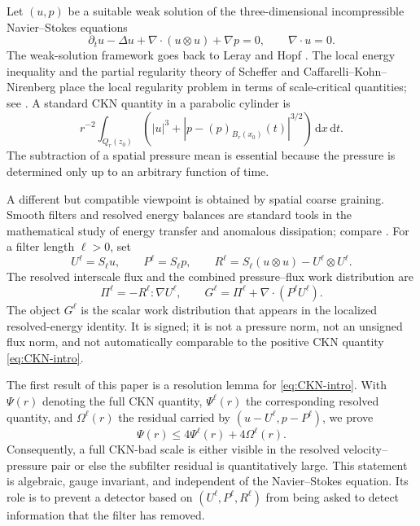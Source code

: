 \documentclass[11pt]{article}
\numberwithin{equation}{section}
\newcommand{\dxdt}{\,\mathrm dx\,\mathrm dt}
\begin{document}
Let \((u,p)\) be a suitable weak solution of the three-dimensional incompressible Navier--Stokes equations
\begin{equation}\label{eq:NS}
\partial_t u-\Delta u+\nabla\cdot(u\otimes u)+\nabla p=0,
\qquad \nabla\cdot u=0.
\end{equation}
The weak-solution framework goes back to Leray and Hopf \cite{Leray1934,Hopf1951}.  The local energy inequality and the partial regularity theory of Scheffer and Caffarelli--Kohn--Nirenberg place the local regularity problem in terms of scale-critical quantities; see \cite{Scheffer1976,CKN1982,Lin1998,Vasseur2007,LemarieRieusset2002,LemarieRieusset2016,Seregin2015}.  A standard CKN quantity in a parabolic cylinder is
\begin{equation}\label{eq:CKN-intro}
r^{-2}\int_{Q_r(z_0)}\left(|u|^3+|p-(p)_{B_r(x_0)}(t)|^{3/2}\right)\dxdt.
\end{equation}
The subtraction of a spatial pressure mean is essential because the pressure is determined only up to an arbitrary function of time.

A different but compatible viewpoint is obtained by spatial coarse graining.  Smooth filters and resolved energy balances are standard tools in the mathematical study of energy transfer and anomalous dissipation; compare \cite{ConstantinETiti1994,DuchonRobert2000,Eyink2005,EyinkAluie2009,DrivasNguyen2018}.  For a filter length \(\ell>0\), set
\[
U^\ell=S_\ell u,
\qquad
P^\ell=S_\ell p,
\qquad
R^\ell=S_\ell(u\otimes u)-U^\ell\otimes U^\ell.
\]
The resolved interscale flux and the combined pressure--flux work distribution are
\begin{equation}\label{eq:G-intro}
\Pi^\ell=-R^\ell:\nabla U^\ell,
\qquad
G^\ell=\Pi^\ell+\nabla\cdot(P^\ell U^\ell).
\end{equation}
The object \(G^\ell\) is the scalar work distribution that appears in the localized resolved-energy identity.  It is signed; it is not a pressure norm, not an unsigned flux norm, and not automatically comparable to the positive CKN quantity \eqref{eq:CKN-intro}.

The first result of this paper is a resolution lemma for \eqref{eq:CKN-intro}.  With \(\Psi(r)\) denoting the full CKN quantity, \(\Psi^\ell(r)\) the corresponding resolved quantity, and \(\Omega^\ell(r)\) the residual carried by \((u-U^\ell,p-P^\ell)\), we prove
\[
\Psi(r)\le 4\Psi^\ell(r)+4\Omega^\ell(r).
\]
Consequently, a full CKN-bad scale is either visible in the resolved velocity--pressure pair or else the subfilter residual is quantitatively large.  This statement is algebraic, gauge invariant, and independent of the Navier--Stokes equation.  Its role is to prevent a detector based on \((U^\ell,P^\ell,R^\ell)\) from being asked to detect information that the filter has removed.
\end{document}
